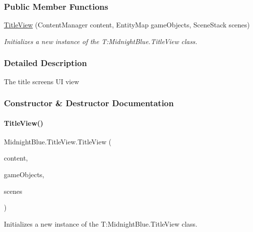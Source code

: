 \subsubsection*{Public Member Functions}
\begin{DoxyCompactItemize}
\item 
\hyperlink{class_midnight_blue_1_1_title_view_ae4322373616e1100eda699d87ee63ff7}{Title\+View} (Content\+Manager content, Entity\+Map game\+Objects, Scene\+Stack scenes)
\begin{DoxyCompactList}\small\item\em Initializes a new instance of the T\+:\+Midnight\+Blue.\+Title\+View class. \end{DoxyCompactList}\end{DoxyCompactItemize}


\subsubsection{Detailed Description}
The title screens UI view 



\subsubsection{Constructor \& Destructor Documentation}
\hypertarget{class_midnight_blue_1_1_title_view_ae4322373616e1100eda699d87ee63ff7}{}\label{class_midnight_blue_1_1_title_view_ae4322373616e1100eda699d87ee63ff7} 
\paragraph{\texorpdfstring{Title\+View()}{TitleView()}}
{\footnotesize\ttfamily Midnight\+Blue.\+Title\+View.\+Title\+View (\begin{DoxyParamCaption}\item[{Content\+Manager}]{content,  }\item[{Entity\+Map}]{game\+Objects,  }\item[{Scene\+Stack}]{scenes }\end{DoxyParamCaption})\hspace{0.3cm}{\ttfamily [inline]}}



Initializes a new instance of the T\+:\+Midnight\+Blue.\+Title\+View class. 


